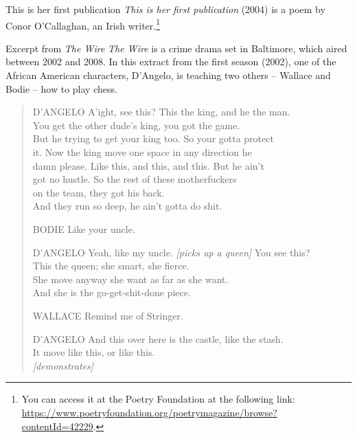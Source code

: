 \begin{texts}{This is her first publication}
\emph{This is her first publication} (2004) is a poem by Conor O'Callaghan, an Irish writer.\footnote{You can access it at the Poetry Foundation at the following link:
\url{https://www.poetryfoundation.org/poetrymagazine/browse?contentId=42229}.}

\end{texts}

\begin{texts}{Excerpt from \emph{The Wire}}
\emph{The Wire} is a crime drama set in Baltimore, which aired between 2002 and 2008. In this extract from the first season (2002), one of the African American characters, D'Angelo, is teaching two others -- Wallace and Bodie -- how to play chess.

\begin{quote}
    \internallinenumbers*{}
    D'ANGELO A'ight, see this? This the king, and he the man.\\ 
    \phantom{D'ANGELO} You get the other dude's king, you got the game.\\
    \phantom{D'ANGELO} But he trying to get your king too. So your gotta protect\\ 
    \phantom{D'ANGELO} it. Now the king move one space in any direction he\\
    \phantom{D'ANGELO} damn please. Like this, and this, and this. But he ain't\\ 
    \phantom{D'ANGELO} got no hustle. So the rest of these motherfuckers\\
    \phantom{D'ANGELO} on the team, they got his back.\\
    \phantom{D'ANGELO} And they run so deep, he ain't gotta do shit.
    
    BODIE\phantom{XXX} Like your uncle.
  
    D'ANGELO Yeah, like my uncle. \emph{[picks up a queen]} You see this?\\ 
    \phantom{D'ANGELO} This the queen; she smart, she fierce.\\ 
    \phantom{D'ANGELO} She move anyway she want as far as she want.\\
    \phantom{D'ANGELO} And she is the go-get-shit-done piece.
  
    WALLACE\phantom{X} Remind me of Stringer.

    D'ANGELO And this over here is the castle, like the stash.\\ 
    \phantom{D'ANGELO} It move like this, or like this.\\
    \phantom{D'ANGELO} \emph{[demonstrates]}


\end{quote}
\end{texts}
